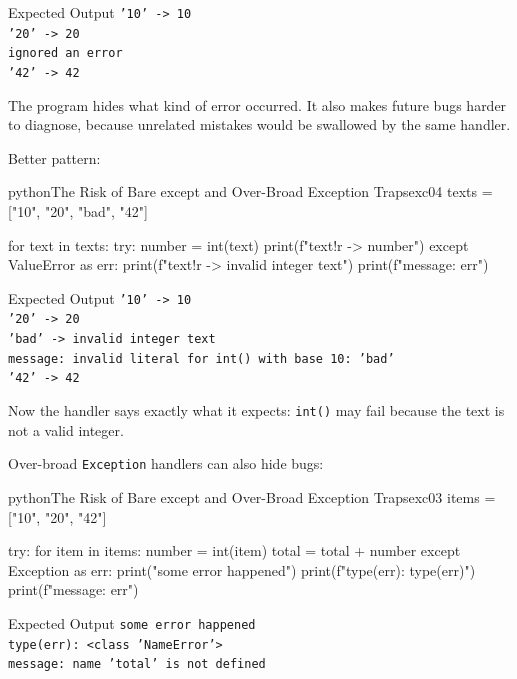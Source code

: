 \documentclass[a4paper,twoside]{report}
\begin{document}
\begin{iobox}{Expected Output}
\texttt{'10' -> 10} \\
\texttt{'20' -> 20} \\
\texttt{ignored an error} \\
\texttt{'42' -> 42} \\
\end{iobox}


The program hides what kind of error occurred. It also makes future bugs harder to diagnose, because unrelated mistakes would be swallowed by the same handler.

Better pattern:

\begin{codebox}[]{python}{The Risk of Bare except and Over-Broad Exception Traps}{exc04}
texts = ["10", "20", "bad", "42"]

for text in texts:
    try:
        number = int(text)
        print(f"{text!r} -> {number}")
    except ValueError as err:
        print(f"{text!r} -> invalid integer text")
        print(f"message: {err}")
\end{codebox}


\begin{iobox}{Expected Output}
\texttt{'10' -> 10} \\
\texttt{'20' -> 20} \\
\texttt{'bad' -> invalid integer text} \\
\texttt{message: invalid literal for int() with base 10: 'bad'} \\
\texttt{'42' -> 42} \\
\end{iobox}


Now the handler says exactly what it expects: \texttt{int()} may fail because the text is not a valid integer.

Over-broad \texttt{Exception} handlers can also hide bugs:

\begin{codebox}[]{python}{The Risk of Bare except and Over-Broad Exception Traps}{exc03}
items = ["10", "20", "42"]

try:
    for item in items:
        number = int(item)
        total = total + number
except Exception as err:
    print("some error happened")
    print(f"type(err): {type(err)}")
    print(f"message: {err}")
\end{codebox}


\begin{iobox}{Expected Output}
\texttt{some error happened} \\
\texttt{type(err): <class 'NameError'>} \\
\texttt{message: name 'total' is not defined} \\
\end{iobox}
\end{document}
